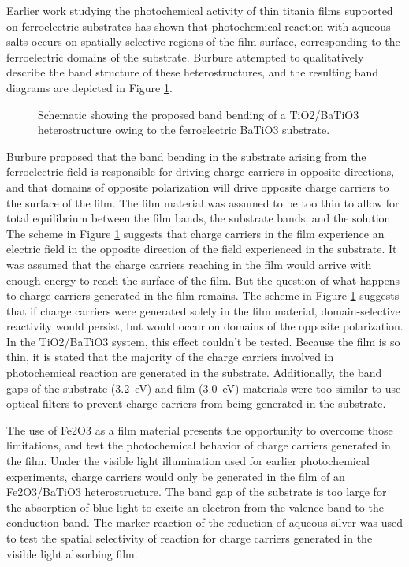 \documentclass[12pt,%
              twoside,
               letterpaper]{uiothesis}
\begin{document}
Earlier work studying the photochemical activity of thin titania films supported on ferroelectric substrates has shown that photochemical reaction with aqueous salts occurs on spatially selective regions of the film surface, corresponding to the ferroelectric domains of the substrate.\cite{Burbure:2010go,Burbure:2006cq,Burbure:2010ti} Burbure \cite{Burbure:2010go} attempted to qualitatively describe the band structure of these heterostructures, and the resulting band diagrams are depicted in Figure \ref{fig:ninabending}. 
\begin{figure}[htbp]
\begin{center}
\caption[Proposed band bending of a TiO2/BaTiO3 heterostructure]{Schematic showing the proposed band bending of a TiO2/BaTiO3 heterostructure owing to the ferroelectric BaTiO3 substrate.\cite{Burbure:2010go}}
\label{fig:ninabending} %
\end{center}
\end{figure}
Burbure proposed that the band bending in the substrate arising from the ferroelectric field is responsible for driving charge carriers in opposite directions, and that domains of opposite polarization will drive opposite charge carriers to the surface of the film. The film material was assumed to be too thin to allow for total equilibrium between the film bands, the substrate bands, and the solution. The scheme in Figure \ref{fig:ninabending} suggests that charge carriers in the film experience an electric field in the opposite direction of the field experienced in the substrate. It was assumed that the charge carriers reaching in the film would arrive with enough energy to reach the surface of the film. But the question of what happens to charge carriers generated in the film remains. The scheme in Figure \ref{fig:ninabending} suggests that if charge carriers were generated solely in the film material, domain-selective reactivity would persist, but would occur on domains of the opposite polarization. In the TiO2/BaTiO3 system, this effect couldn't be tested. Because the film is so thin, it is stated that the majority of the charge carriers involved in photochemical reaction are generated in the substrate. Additionally, the band gaps of the substrate (\texttildelow\SI{3.2}{\electronvolt}) and film (\texttildelow\SI{3.0}{\electronvolt}) materials were too similar to use optical filters to prevent charge carriers from being generated in the substrate. 

The use of Fe2O3 as a film material presents the opportunity to overcome those limitations, and test the photochemical behavior of charge carriers generated in the film. Under the visible light illumination used for earlier photochemical experiments, charge carriers would only be generated in the film of an Fe2O3/BaTiO3 heterostructure. The band gap of the substrate is too large for the absorption of blue light to excite an electron from the valence band to the conduction band. The marker reaction of the reduction of aqueous silver was used to test the spatial selectivity of reaction for charge carriers generated in the visible light absorbing film.
\end{document}
